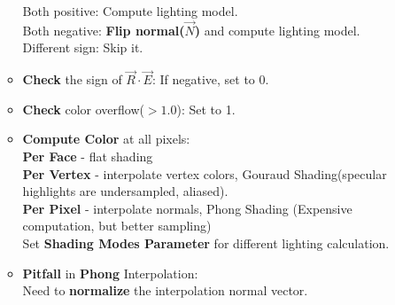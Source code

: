 \documentclass[geye,cyan,normal,en]{elegantnote}
\begin{document}
\begin{enumerate}
\begin{itemize}
		Both positive: Compute lighting model.\\
		Both negative: \textbf{Flip normal($\vec{N}$)} and compute lighting model.\\
		Different sign: Skip it.
		\item \textbf{Check} the sign of \textbf{$\vec{R}\cdot\vec{E}$}: If negative, set to 0.
		\item \textbf{Check} color overflow($>1.0$): Set to 1.
		\item \textbf{Compute Color} at all pixels:\\
		\textbf{Per Face} - flat shading\\
		\textbf{Per Vertex} - interpolate vertex colors, Gouraud Shading(specular highlights are undersampled, aliased).\\
		\textbf{Per Pixel} - interpolate normals, Phong Shading (Expensive computation, but better sampling)\\
		Set \textbf{Shading Modes Parameter} for different lighting calculation.
		\item \textbf{Pitfall} in \textbf{Phong} Interpolation:\\
		Need to \textbf{normalize} the interpolation normal vector.
	\end{itemize}
\end{enumerate}
\end{document}
